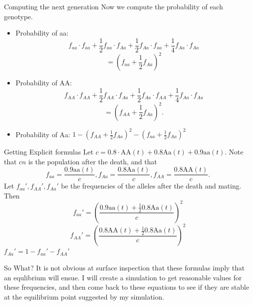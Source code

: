 \documentclass[xcolor=x11names, svgnames, rgb]{beamer}
\newcommand{\dom}{\text{AA}}
\newcommand{\het}{\text{Aa}}
\newcommand{\rec}{\text{aa}}
\begin{document}


\begin{frame}[t]{Computing the next generation}
	Now we compute the probability of each genotype.
	\begin{itemize}
		\item Probability of aa: $$f_{aa}\cdot f_{aa} + \frac{1}{2}f_{aa}\cdot f_{Aa} + \frac{1}{2}f_{Aa} \cdot f_{aa} + \frac{1}{4} f_{Aa}\cdot f_{Aa}$$
			$$=(f_{aa} + \frac{1}{2}f_{Aa})^2$$
		\item Probability of AA: $$f_{AA}\cdot f_{AA} + \frac{1}{2}f_{AA}\cdot f_{Aa} + \frac{1}{2}f_{Aa}\cdot f_{AA} + \frac{1}{4}f_{Aa} \cdot f_{Aa}$$
			$$=(f_{AA} + \frac{1}{2}f_{Aa})^2.$$
		\item Probability of Aa: $1-(f_{AA} + \frac{1}{2}f_{Aa})^2 - (f_{aa} + \frac{1}{2}f_{Aa})^2$
	\end{itemize}
\end{frame}

\begin{frame}[t]{Getting Explicit formulas}
	Let $c = 0.8\cdot \dom(t) + 0.8 \het(t) + 0.9 \rec(t)$. Note that $c n$ is the population after the death, and that 
	$$f_{aa} = \frac{0.9 \rec(t)}{c}, f_{Aa} = \frac{0.8 \het(t)}{c}, f_{AA} = \frac{0.8 \dom(t)}{c}.$$
	Let $f_{aa}', f_{AA}', f_{Aa}'$ be the frequencies of the alleles after the death and mating.
	Then
	$$f_{aa}' = \left(\frac{0.9\rec(t) + \frac{1}{2} 0.8 \het(t)}{c}\right)^2$$
	$$f_{AA}' = \left(\frac{0.8\dom(t) + \frac{1}{2} 0.8 \het(t)}{c}\right)^2$$
	$f_{Aa}' = 1 - f_{aa}' - f_{AA}'$
\end{frame}

\begin{frame}[t]{So What?}
	It is not obvious at surface inspection that these formulas imply that an
	equlibrium will ensue. I will create a simulation to get reasonable values
	for these frequencies, and then come back to these equations to see if they
	are stable at the equilibrium point suggested by my simulation.
\end{frame}
\end{document}
